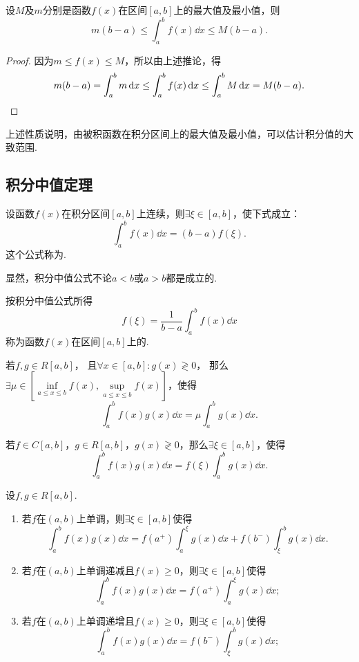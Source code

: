 \begin{property}\label{theorem:定积分.定积分性质6}
设\(M\)及\(m\)分别是函数\(f(x)\)在区间\([a,b]\)上的最大值及最小值，则\[
m(b-a) \leq \int_a^b f(x) \dd{x} \leq M(b-a).
\]
\begin{proof}
因为\(m \leq f(x) \leq M\)，所以由上述推论，得\[
m(b-a) = \int_a^b m \dd{x} \leq \int_a^b f(x) \dd{x} \leq \int_a^b M \dd{x} = M(b-a).
\qedhere
\]
\end{proof}
\end{property}
上述性质说明，由被积函数在积分区间上的最大值及最小值，可以估计积分值的大致范围.

\subsection{积分中值定理}
\begin{theorem}[定积分中值定理]\label{theorem:定积分.积分中值定理0}
设函数\(f(x)\)在积分区间\([a,b]\)上连续，则\(\exists\xi\in[a,b]\)，使下式成立：\[
\int_a^b f(x) \dd{x} = (b-a) f(\xi).
\]这个公式称为.
\end{theorem}
显然，积分中值公式不论\(a<b\)或\(a>b\)都是成立的.

按积分中值公式所得\[
f(\xi) = \frac{1}{b-a} \int_a^b f(x) \dd{x}
\]称为函数\(f(x)\)在区间\([a,b]\)上的.

\begin{theorem}[积分第一中值定理]\label{theorem:定积分.积分中值定理1}
若\(f,g \in R[a,b]\)，
且\(\forall x\in[a,b] : g(x) \gtrless 0\)，
那么\(\exists\mu\in\left[\inf\limits_{a \leq x \leq b} f(x),\sup\limits_{a \leq x \leq b} f(x)\right]\)，使得\[
\int_a^b f(x) g(x) \dd{x} = \mu \int_a^b g(x) \dd{x}.
\]
\end{theorem}

\begin{corollary}\label{theorem:定积分.积分中值定理1推论1}
若\(f \in C[a,b]\)，\(g \in R[a,b]\)，\(g(x) \gtrless 0\)，那么\(\exists\xi\in[a,b]\)，使得\[
\int_a^b f(x) g(x) \dd{x} = f(\xi) \int_a^b g(x) \dd{x}.
\]
\end{corollary}

\begin{theorem}[积分第二中值定理]\label{theorem:定积分.积分中值定理2}
设\(f,g \in R[a,b]\).\begin{enumerate}
\item 若\(f\)在\((a,b)\)上单调，则\(\exists \xi \in [a,b]\)使得\[
\int_a^b f(x) g(x) \dd{x} = f(a^+) \int_a^{\xi} g(x) \dd{x} + f(b^-) \int_{\xi}^b g(x) \dd{x}.
\]
\item 若\(f\)在\((a,b)\)上单调递减且\(f(x) \geq 0\)，则\(\exists \xi \in [a,b]\)使得\[
\int_a^b f(x) g(x) \dd{x} = f(a^+) \int_a^{\xi} g(x) \dd{x};
\]
\item 若\(f\)在\((a,b)\)上单调递增且\(f(x) \geq 0\)，则\(\exists \xi \in [a,b]\)使得\[
\int_a^b f(x) g(x) \dd{x} = f(b^-) \int_{\xi}^b g(x) \dd{x};
\]
\end{enumerate}
\end{theorem}

